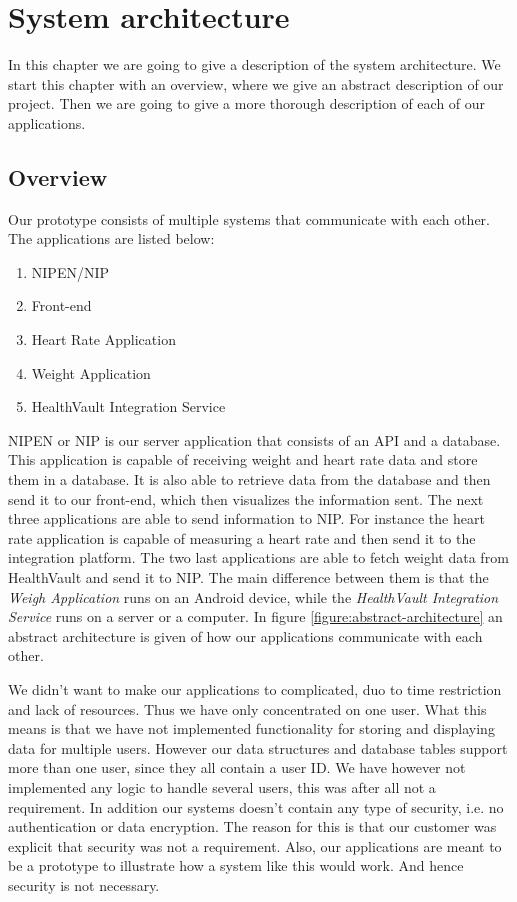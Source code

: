 \chapter{System architecture}
\label{ch:architecture}


In this chapter we are going to give a description of the system architecture.
We start this chapter with an overview, where we give an abstract description of our project.
Then we are going to give a more thorough description of each of our applications.

\section{Overview}

Our prototype consists of multiple systems that communicate with each other.
The applications are listed below:

\begin{enumerate}
	\item NIPEN/NIP
	\item Front-end
	\item Heart Rate Application
	\item Weight Application
	\item HealthVault Integration Service
\end{enumerate}

NIPEN or NIP is our server application that consists of an API and a database.
This application is capable of receiving weight and heart rate data and store them in a database.
It is also able to retrieve data from the database and then send it to our front-end, which then visualizes the information sent.
The next three applications are able to send information to NIP.
For instance the heart rate application is capable of measuring a heart rate and then send it to the integration platform.
The two last applications are able to fetch weight data from HealthVault and send it to NIP.
The main difference between them is that the \textit{Weigh Application} runs on an Android device, while the \textit{HealthVault Integration Service} runs on a server or a computer.
In figure \ref{figure:abstract-architecture} an abstract architecture is given of how our applications communicate with each other.

We didn't want to make our applications to complicated, duo to time restriction and lack of resources.
Thus we have only concentrated on one user.
What this means is that we have not implemented functionality for storing and displaying data for multiple users.
However our data structures and database tables support more than one user, since they all contain a user ID.
We have however not implemented any logic to handle several users, this was after all not a requirement.
In addition our systems doesn't contain any type of security, i.e. no authentication or data encryption.
The reason for this is that our customer was explicit that security was not a requirement.
Also, our applications are meant to be a prototype to illustrate how a system like this would work.
And hence security is not necessary.

